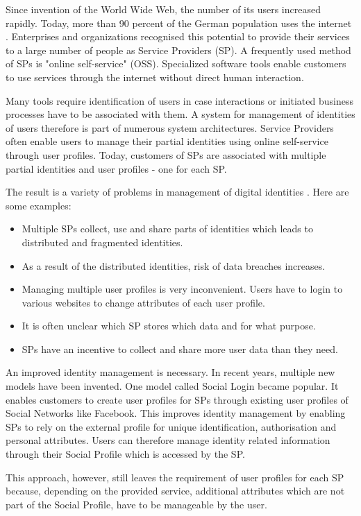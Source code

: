 Since invention of the World Wide Web, the number of its users increased rapidly. Today, more than 90 percent of the German population uses the internet \cite{Onlinestudie}. Enterprises and organizations recognised this potential to provide their services to a large number of people as Service Providers (SP). A frequently used method of SPs is "online self-service" (OSS). Specialized software tools enable customers to use services through the internet without direct human interaction.

Many tools require identification of users in case interactions or initiated business processes have to be associated with them. A system for management of identities of users therefore is part of numerous system architectures. Service Providers often enable users to manage their partial identities using online self-service through user profiles. Today, customers of SPs are associated with multiple partial identities and user profiles - one for each SP.

The result is a variety of problems in management of digital identities \cite{IdentityCrisis}. Here are some examples:
\begin{itemize}
    \item Multiple SPs collect, use and share parts of identities which leads to distributed and fragmented identities.
    \item As a result of the distributed identities, risk of data breaches increases.
    \item Managing multiple user profiles is very inconvenient. Users have to login to various websites to change attributes of each user profile.
    \item It is often unclear which SP stores which data and for what purpose.
    \item SPs have an incentive to collect and share more user data than they need.
\end{itemize}

An improved identity management is necessary. In recent years, multiple new models have been invented. One model called Social Login became popular. It enables customers to create user profiles for SPs through existing user profiles of Social Networks like Facebook. This improves identity management by enabling SPs to rely on the external profile for unique identification, authorisation and personal attributes. Users can therefore manage identity related information through their Social Profile which is accessed by the SP.

This approach, however, still leaves the requirement of user profiles for each SP because, depending on the provided service, additional attributes which are not part of the Social Profile, have to be manageable by the user.

